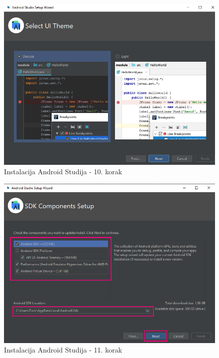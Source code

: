 \documentclass[11pt,a4paper,twoside]{article}
\begin{document}
\begin{figure}[!h]
	\centering
	\includegraphics[width=\textwidth]{install_10.png}
	\caption{Instalacija Android Studija - 10. korak}
	\label{fig:install_10}	
\end{figure}

\begin{figure}[!h]
	\centering
	\includegraphics[width=\textwidth]{install_11.png}
	\caption{Instalacija Android Studija - 11. korak}
	\label{fig:install_11}	
\end{figure}
\end{document}
